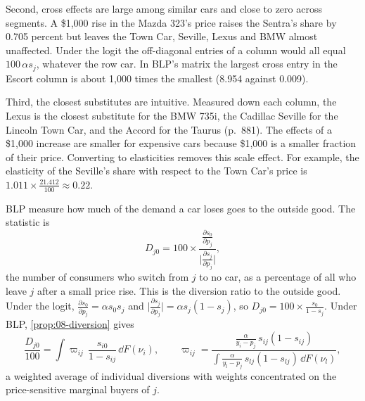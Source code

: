 Second, cross effects are large among similar cars and close to zero across segments. A \$1,000 rise in
the Mazda 323's price raises the Sentra's share by 0.705 percent but leaves the Town Car, Seville, Lexus
and BMW almost unaffected. Under the logit the off-diagonal entries of a column would all equal
$100\,\alpha s_j$, whatever the row car. In BLP's matrix the largest cross entry in the Escort column is
about 1,000 times the smallest (8.954 against 0.009).

Third, the closest substitutes are intuitive. Measured down each column, the Lexus is the closest
substitute for the BMW 735i, the Cadillac Seville for the Lincoln Town Car, and the Accord for the Taurus
(p.~881). The effects of a \$1,000 increase are smaller for expensive cars because \$1,000 is a smaller
fraction of their price. Converting to elasticities removes this scale effect. For example, the
elasticity of the Seville's share with respect to the Town Car's price is
$1.011\times\frac{21.412}{100}\approx0.22$.

BLP measure how much of the demand a car loses goes to the outside good. The statistic is
\begin{equation*}
D_{j0}=100\times\frac{\frac{\partial s_0}{\partial p_j}}{\big|\frac{\partial s_j}{\partial p_j}\big|},
\end{equation*}
the number of consumers who switch from $j$ to no car, as a percentage of all who leave $j$ after a small
price rise. This is the diversion ratio to the outside good. Under the logit,
$\frac{\partial s_0}{\partial p_j}=\alpha s_0s_j$ and
$\big|\frac{\partial s_j}{\partial p_j}\big|=\alpha s_j(1-s_j)$, so
$D_{j0}=100\times\frac{s_0}{1-s_j}$. Under BLP, \cref{prop:08-diversion} gives
\begin{equation*}
\frac{D_{j0}}{100}=\int\varpi_{ij}\,\frac{s_{i0}}{1-s_{ij}}\,\dd F(\nu_i),\qquad
\varpi_{ij}=\frac{\frac{\alpha}{y_i-p_j}\,s_{ij}(1-s_{ij})}
{\int\frac{\alpha}{y_l-p_j}\,s_{lj}(1-s_{lj})\,\dd F(\nu_l)},
\end{equation*}
a weighted average of individual diversions with weights concentrated on the price-sensitive marginal
buyers of $j$.

